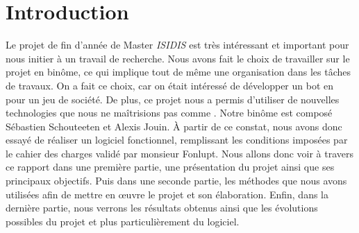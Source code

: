 \section{Introduction}
Le projet de fin d'année de Master \emph{ISIDIS} est très intéressant et important pour nous initier à un travail de recherche.
Nous avons fait le choix de travailler sur le projet \himalaya en binôme, ce qui implique tout de même une organisation dans les tâches de travaux.
On a fait ce choix, car on était intéressé de développer un bot en \java pour un jeu de société.
De plus, ce projet nous a permis d’utiliser de nouvelles technologies que nous ne maîtrisions pas comme \fx.
Notre binôme est composé Sébastien Schouteeten et Alexis Jouin.
À partir de ce constat, nous avons donc essayé de réaliser un logiciel fonctionnel, remplissant les conditions imposées par le cahier des charges validé par monsieur Fonlupt. Nous allons donc voir à travers ce rapport dans une première partie, une présentation du projet ainsi que ses principaux objectifs. Puis dans une seconde partie, les méthodes que nous avons utilisées afin de mettre en \oe uvre le projet et son élaboration. Enfin, dans la dernière partie, nous verrons les résultats obtenus ainsi que les évolutions possibles du projet et plus particulièrement du logiciel.